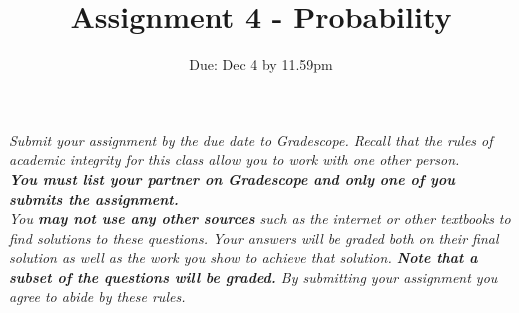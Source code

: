 \documentclass{article}
\begin{document}
\small
\title{\Large Assignment 4 - Probability}
\date{Due: Dec 4 by 11.59pm}
\maketitle

\noindent\textsl{ Submit your assignment by the due date to Gradescope. Recall that the rules of academic integrity for this class allow you to work with one other person.\\[1.0ex]
 \textbf{You must list your partner on Gradescope and only one of you submits the assignment.}\\[1.0ex]
You \textbf{may not use any other sources} such as the internet or other textbooks to find solutions to these questions. Your answers will be graded both on their final solution as well as the work you show to achieve that solution. \textbf{Note that a subset of the questions will be graded.}  By submitting your assignment you agree to abide by these rules.}\\

\noindent\hrulefill\\
\end{document}
